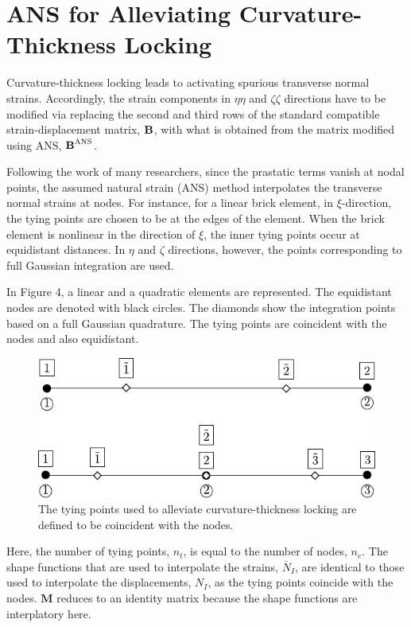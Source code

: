 \documentclass[12pt]{article}
\begin{document}
\section{ANS for Alleviating Curvature-Thickness Locking}

Curvature-thickness locking leads to activating spurious transverse normal strains. Accordingly, the strain components in $\eta \eta$ and $\zeta \zeta$ directions have to be modified via replacing the second and third rows of the standard compatible strain-displacement matrix, $\text{\bf{B}}$, with what is obtained from the matrix modified using ANS, $\text{\bf{B}}^{\text{ANS}}$.

Following the work of many researchers, since the prastatic terms vanish at nodal points, the assumed natural strain (ANS) method interpolates the transverse normal strains at nodes. For instance, for a linear brick element, in $\xi$-direction, the tying points are chosen to be at the edges of the element. When the brick element is nonlinear in the direction of $\xi$, the inner tying points occur at equidistant distances. In $\eta$ and $\zeta$ directions, however, the points corresponding to full Gaussian integration are used.


In Figure 4, a linear and a quadratic elements are represented. The equidistant nodes are denoted with black circles. The diamonds show the integration points based on a full Gaussian quadrature. The tying points are coincident with the nodes and also equidistant.

\begin{figure}[hbt!]
\centering
\includegraphics[scale=1]{coincident_tying_points_curvature_locking.pdf}
\caption{The tying points used to alleviate curvature-thickness locking are defined to be coincident with the nodes.}
\end{figure}

Here, the number of tying points, $n_t$, is equal to the number of nodes, $n_e$. The shape functions that are used to interpolate the strains, $\bar{N}_I$, are identical to those used to interpolate the displacements, $N_I$, as the tying points coincide with the nodes. $\boldsymbol{M}$ reduces to an identity matrix because the shape functions are interplatory here.
\end{document}
